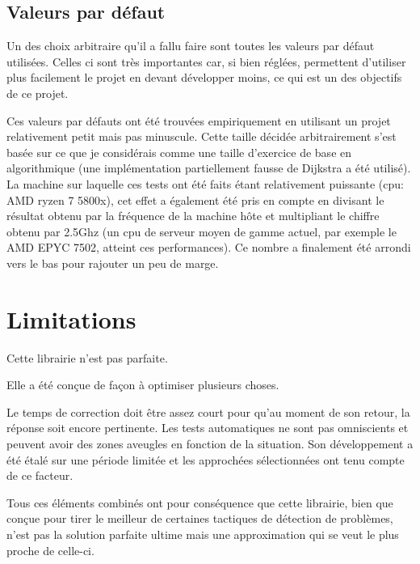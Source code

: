 \documentclass[a4paper]{report}
\begin{document}
\subsection{Valeurs par défaut}
Un des choix arbitraire qu'il a fallu faire sont toutes les valeurs par défaut utilisées.
Celles ci sont très importantes car, si bien réglées, permettent d'utiliser plus facilement le projet en devant développer moins, ce qui est un des objectifs de ce projet.

Ces valeurs par défauts ont été trouvées empiriquement en utilisant un projet relativement petit mais pas minuscule.
Cette taille décidée arbitrairement s'est basée sur ce que je considérais comme une taille d'exercice de base en algorithmique (une implémentation partiellement fausse de Dijkstra a été utilisé).
La machine sur laquelle ces tests ont été faits étant relativement puissante (cpu: AMD ryzen 7 5800x), cet effet a également été pris en compte en divisant le résultat obtenu par la fréquence de la machine hôte et multipliant le chiffre obtenu par 2.5Ghz (un cpu de serveur moyen de gamme actuel, par exemple le AMD EPYC 7502, atteint ces performances).
Ce nombre a finalement été arrondi vers le bas pour rajouter un peu de marge.


\section{Limitations}


\begin{center}
Cette librairie n'est pas parfaite.
\end{center}

Elle a été conçue de façon à optimiser plusieurs choses.

Le temps de correction doit être assez court pour qu’au moment de son retour, la réponse soit encore pertinente.
Les tests automatiques ne sont pas omniscients et peuvent avoir des zones aveugles en fonction de la situation.
Son développement a été étalé sur une période limitée et les approchées sélectionnées ont tenu compte de ce facteur.


Tous ces éléments combinés ont pour conséquence que cette librairie, bien que conçue pour tirer le meilleur de certaines tactiques de détection de problèmes, n'est pas la solution parfaite ultime mais une approximation qui se veut le plus proche de celle-ci.
\end{document}
